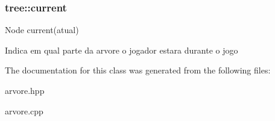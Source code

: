 \subsubsection[{\texorpdfstring{current}{current}}]{ tree\+::current}\hypertarget{classtree_a8e4a9bb8cd65cf2c4c781e4be86b6f0d}{}\label{classtree_a8e4a9bb8cd65cf2c4c781e4be86b6f0d}
Node current(atual)

Indica em qual parte da arvore o jogador estara durante o jogo 

The documentation for this class was generated from the following files\+:\begin{DoxyCompactItemize}
\item 
arvore.\+hpp\item 
arvore.\+cpp\end{DoxyCompactItemize}
